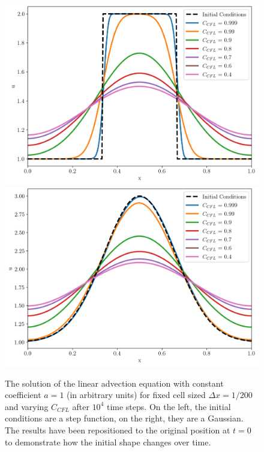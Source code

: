 \begin{figure}
    \centering
    \includegraphics[width=.5\textwidth]{
    ./figures/FV/advection_pwconst/advection-1D-diffusivity-cfl-step.png}%
    \includegraphics[width=.5\textwidth]{
    ./figures/FV/advection_pwconst/advection-1D-diffusivity-cfl-gaussian.png}%
    \caption[Dependence of the numerical diffusion on $C_{CFL}$.]{
The solution of the linear advection equation with constant coefficient $a = 1$ (in arbitrary units)
for fixed cell sized $\Delta x = 1/200$ and varying $C_{CFL}$ after $10^4$ time steps. On the left,
the initial conditions are a step function, on the right, they are a Gaussian. The results have been
repositioned to the original position at $t=0$ to demonstrate how the initial shape changes over
time.
    }%
    \label{fig:linear-advection-diffusivity-cfl}
\end{figure}



